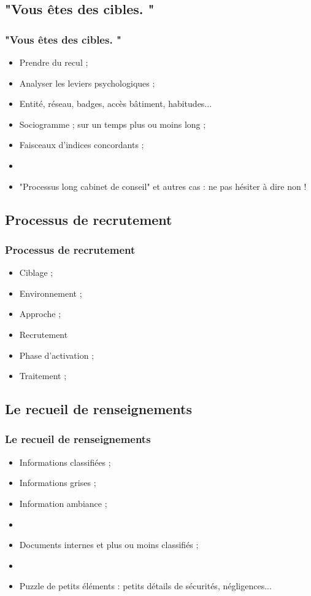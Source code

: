 \documentclass[slidetop,11pt]{beamer}
\begin{document}
\subsection{"Vous {\^e}tes des cibles. "}
\begin{frame}
	\frametitle{"Vous {\^e}tes des cibles. "}
	\begin{itemize}
		\item Prendre du recul ; 
		\item Analyser les leviers psychologiques ; 
		\item Entit{\'e}, r{\'e}seau, badges, acc{\`e}s b{\^a}timent, habitudes...
		\item Sociogramme ; sur un temps plus ou moins long ; 
		\item Faisceaux d'indices concordants ; 
		\item[] 
		\item "Processus long cabinet de conseil" et autres cas : ne pas h{\'e}siter {\`a} dire non !
	\end{itemize}
\end{frame}

\subsection{Processus de recrutement }
\begin{frame}
	\frametitle{Processus de recrutement }
	\begin{itemize}
		\item Ciblage ; 
		\item Environnement ; 
		\item Approche ; 
		\item Recrutement 
		\item Phase d'activation ; 
		\item Traitement ; 
	\end{itemize}
\end{frame}

\subsection{Le recueil de renseignements}
\begin{frame}
	\frametitle{Le recueil de renseignements}
	\begin{itemize}
		\item Informations classifi{\'e}es ; 
		\item Informations grises ; 
		\item Information ambiance ; 
		\item[] 
		\item Documents internes et plus ou moins classifi{\'e}s ; 
		\item[] 
		\item Puzzle de petits {\'e}l{\'e}ments : petits d{\'e}tails de s{\'e}curit{\'e}s, n{\'e}gligences... 
	\end{itemize}
\end{frame}
\end{document}
